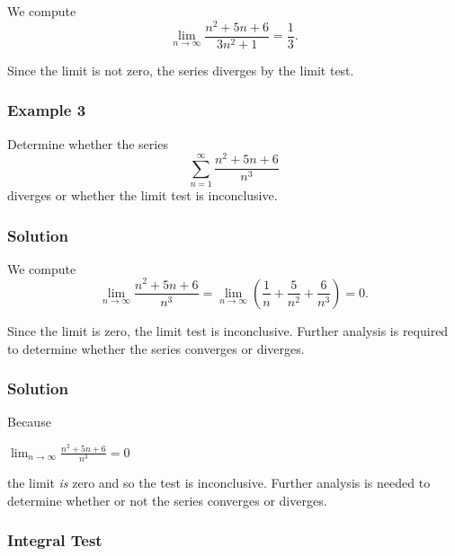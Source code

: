 We compute
\[
\lim_{n \to \infty} \frac{n^2 + 5n + 6}{3n^2 + 1} = \frac{1}{3}.
\]

Since the limit is not zero, the series diverges by the limit test.

\subsubsection{Example 3}
\label{sss:exam-ad87}

Determine whether the series
\[
\sum_{n=1}^{\infty} \frac{n^2 + 5n + 6}{n^3}
\]
diverges or whether the limit test is inconclusive.

\subsubsection{Solution}
\label{sss:solu-ad87}

We compute
\[
\lim_{n \to \infty} \frac{n^2 + 5n + 6}{n^3}
= \lim_{n \to \infty} \left(\frac{1}{n} + \frac{5}{n^2} + \frac{6}{n^3}\right)
= 0.
\]

Since the limit is zero, the limit test is inconclusive. Further analysis 
is required to determine whether the series converges or diverges.


\subsubsection{Solution}
\label{sss:solu-5502}


Because


$\lim _{n \rightarrow \infty}{\frac{n^2+5n+6}{n^3}}= 0$


the limit \textit{is} zero and so the test is inconclusive. Further analysis is needed to determine whether or not the series converges or diverges.


\subsubsection{Integral Test}
\label{sss:inte-e4c4}


